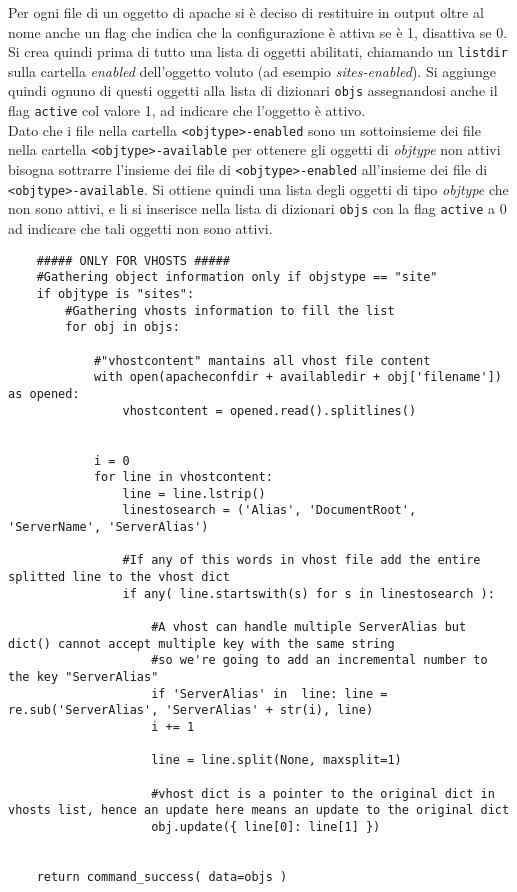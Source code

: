 \documentclass[11pt]{article}
\begin{document}
Per ogni file di un oggetto di apache si è deciso di restituire in output oltre al nome anche un flag che indica che la configurazione
è attiva se è 1, disattiva se 0. Si crea quindi prima di tutto una lista di oggetti abilitati, chiamando un \texttt{listdir} sulla
cartella \textit{enabled} dell'oggetto voluto (ad esempio \textit{sites-enabled}). Si aggiunge quindi ognuno di questi oggetti alla
lista di dizionari \texttt{objs} assegnandosi anche il flag \texttt{active} col valore 1, ad indicare che l'oggetto è attivo.\\
Dato che i file nella cartella \texttt{<objtype>-enabled} sono un sottoinsieme dei file nella cartella \texttt{<objtype>-available}
per ottenere gli oggetti di \textit{objtype} non attivi bisogna sottrarre l'insieme dei file di \texttt{<objtype>-enabled}
all'insieme dei file di \texttt{<objtype>-available}. Si ottiene quindi una lista degli oggetti di tipo \textit{objtype}
che non sono attivi, e li si inserisce nella lista di dizionari \texttt{objs} con la flag \texttt{active} a 0 ad indicare che tali oggetti
non sono attivi.
\begin{lstlisting}
    ##### ONLY FOR VHOSTS #####
    #Gathering object information only if objstype == "site"
    if objtype is "sites":
        #Gathering vhosts information to fill the list
        for obj in objs:

            #"vhostcontent" mantains all vhost file content
            with open(apacheconfdir + availabledir + obj['filename']) as opened:
                vhostcontent = opened.read().splitlines()

            
            i = 0
            for line in vhostcontent:
                line = line.lstrip()
                linestosearch = ('Alias', 'DocumentRoot', 'ServerName', 'ServerAlias')

                #If any of this words in vhost file add the entire splitted line to the vhost dict
                if any( line.startswith(s) for s in linestosearch ):

                    #A vhost can handle multiple ServerAlias but dict() cannot accept multiple key with the same string
                    #so we're going to add an incremental number to the key "ServerAlias"
                    if 'ServerAlias' in  line: line = re.sub('ServerAlias', 'ServerAlias' + str(i), line)
                    i += 1

                    line = line.split(None, maxsplit=1)

                    #vhost dict is a pointer to the original dict in vhosts list, hence an update here means an update to the original dict
                    obj.update({ line[0]: line[1] })


    return command_success( data=objs )
\end{lstlisting}
\end{document}
